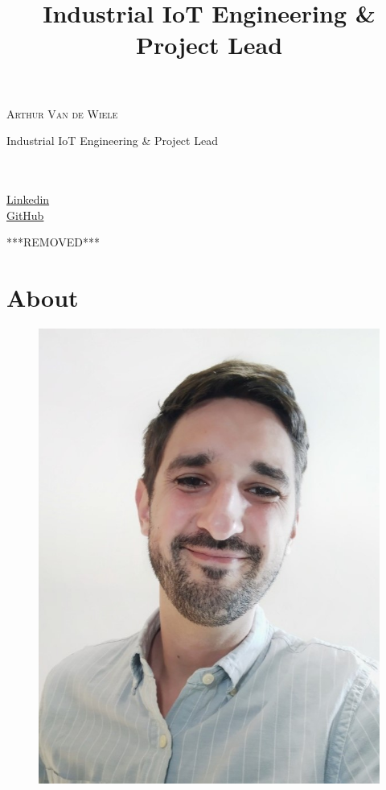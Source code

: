 \documentclass[10pt,a4paper]{moderncv}
\title{Industrial IoT Engineering \& Project Lead}
\begin{document}
\begin{minipage}[t]{0.75\textwidth}
    \vspace{1em}
    {\color{color1}\Huge\scshape Arthur Van de Wiele}
    \vspace{0.5em}
    {\par\color{color2}\Large Industrial IoT Engineering \& Project Lead}
\end{minipage}
\begin{minipage}[t]{0.25\textwidth}
    \emailsymbol\hspace{1em} \\
    \mobilephonesymbol\hspace{1em }\\
    \faLinkedin\hspace{1em} \href{https://www.linkedin.com/in/arthur-van-de-wiele/}{Linkedin}\\
    \faGithubSquare\hspace{1em} \href{https://www.linkedin.com/in/arthur-van-de-wiele/}{GitHub}
\end{minipage}

\vspace{1em}
{\par\color{color2}***REMOVED***}

\section{About}

\begin{figure}
    \includegraphics[width=\linewidth]{me}
\end{figure}
\end{document}
